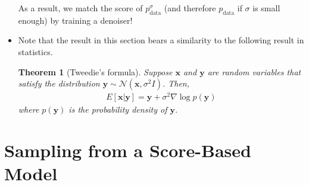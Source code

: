 \documentclass[10pt]{article}
\newtheorem{theorem}[lemma]{Theorem}
\newcommand{\ve}[1]{\mathbf{#1}}
\newcommand{\mrm}[1]{\mathrm{#1}}
\newcommand{\mcal}[1]{\mathcal{#1}}
\begin{document}
\begin{itemize}
  As a result, we match the score of $p^\sigma_{\mrm{data}}$ (and therefore $p_{\mrm{data}}$ if $\sigma$ is small enough) by training a denoiser!

  \item Note that the result in this section bears a similarity to the following result in statistics.

  \begin{theorem}[Tweedie's formula] \label{thm:tweedie}
    Suppose $\ve{x}$ and $\ve{y}$ are random variables that satisfy the distribution $\ve{y} \sim \mcal{N}(\ve{x}, \sigma^2 I)$. Then,
    \begin{align*}
      E[\ve{x}|\ve{y}] = \ve{y} + \sigma^2 \nabla \log p(\ve{y})
    \end{align*}
    where $p(\ve{y})$ is the probability density of $\ve{y}$.
  \end{theorem}
\end{itemize}

\section{Sampling from a Score-Based Model}
\end{document}
